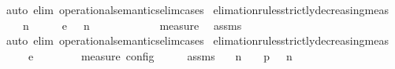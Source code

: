 \begin{isabellebody}
\ {\isacharparenleft}auto\ elim{\isacharcolon}\ operational{\isacharunderscore}semantics{\isacharunderscore}elim{\isachardot}cases{\isacharparenright}%
\endisatagproof
{\isafoldproof}%
%
\isadelimproof
\isanewline
%
\endisadelimproof
\isanewline
{}\isamarkupfalse%
\ elimation{\isacharunderscore}rules{\isacharunderscore}strictly{\isacharunderscore}decreasing{\isacharunderscore}meas{\isacharcolon}\isanewline
\ \ \ {\isacartoucheopen}{\isacharparenleft}{\isasymGamma}\ n\ {\isasymturnstile}\ {\isasymPsi}\ {\isasymtriangleright}\ {\isasymPhi}\ \ {\isasymhookrightarrow}\isactrlsub e\ \ {\isacharparenleft}{\isasymGamma}\ n\ {\isasymturnstile}\ {\isasymPsi}\ {\isasymtriangleright}\ {\isasymPhi}\isanewline
\ \ \ \ \ {\isacartoucheopen}{\isacharparenleft}{\isasymPsi}\ {\isasymPsi}\ {\isasymin}\ measure\ {\isasymmu}{\isacartoucheclose}\isanewline
%
\isadelimproof
%
\endisadelimproof
%
\isatagproof
{}\isamarkupfalse%
\ assms\ \isamarkupfalse%
\ {\isacharparenleft}auto\ elim{\isacharcolon}\ operational{\isacharunderscore}semantics{\isacharunderscore}elim{\isachardot}cases{\isacharparenright}%
\endisatagproof
{\isafoldproof}%
%
\isadelimproof
\isanewline
%
\endisadelimproof
\isanewline
{}\isamarkupfalse%
\ elimation{\isacharunderscore}rules{\isacharunderscore}strictly{\isacharunderscore}decreasing{\isacharunderscore}meas{\isacharprime}{\isacharcolon}\isanewline
\ \ \ {\isacartoucheopen}{\isasymS}\ \ {\isasymhookrightarrow}\isactrlsub e\ \ {\isasymS}\isanewline
\ \ \ {\isacartoucheopen}{\isacharparenleft}{\isasymS}\ {\isasymS}\ {\isasymin}\ measure\ {\isasymmu}\isactrlsub c\isactrlsub o\isactrlsub n\isactrlsub f\isactrlsub i\isactrlsub g{\isacartoucheclose}\isanewline
%
\isadelimproof
%
\endisadelimproof
%
\isatagproof
{}\isamarkupfalse%
\ {\isacharminus}\isanewline
\ \ \isamarkupfalse%
\ assms\ \isamarkupfalse%
\ {\isasymGamma}\ n\ {\isasymPsi}\ {\isasymPhi}\ \ p{}{\isacharcolon}{\isacartoucheopen}{\isasymS}\ {\isacharequal}\ {\isacharparenleft}{\isasymGamma}\ n\ {\isasymturnstile}\ {\isasymPsi}\ {\isasymtriangleright}\ {\isasymPhi}\isanewline

\end{isabellebody}
